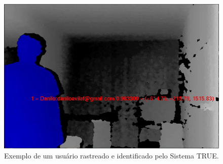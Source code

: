 	\begin{figure}[htb]
			\begin{center}
				\includegraphics[scale=0.5]{figuras/4.ProblemaEProposta/user-reconhecido.png}
			\end{center}
			\caption{Exemplo de um usuário rastreado e identificado pelo Sistema TRUE.}
			\label{fig:truetotal}
		\end{figure}

